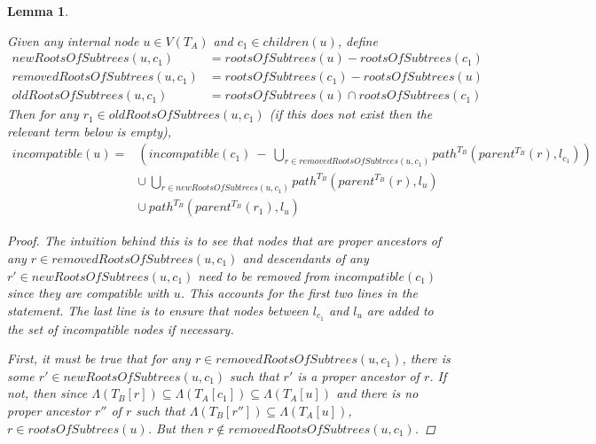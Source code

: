 \documentclass{article}
\newcommand{\leafset}{\Lambda}
\newtheorem{incompatibilityrecursive}[incompatibility]{Lemma}
\begin{document}
    \begin{incompatibilityrecursive}
        \label{lem:incompatibilityrecursive}

        Given any internal node $u \in V(T_A)$ and $c_1 \in children(u)$, define
        \begin{align*}
            newRootsOfSubtrees(u, c_1) &= rootsOfSubtrees(u) - rootsOfSubtrees(c_1)\\[0.5em]
            removedRootsOfSubtrees(u, c_1) &= rootsOfSubtrees(c_1) - rootsOfSubtrees(u)\\[0.5em]
            oldRootsOfSubtrees(u, c_1) &= rootsOfSubtrees(u) \cap rootsOfSubtrees(c_1)
        \end{align*}
        Then for any $r_1 \in oldRootsOfSubtrees(u, c_1)$ (if this does not exist then the relevant term below is empty),
        \begin{align*}
            incompatible(u) = &\left(incompatible(c_1)\ -\ \bigcup_{r \in removedRootsOfSubtrees(u, c_1)} path^{T_B}(parent^{T_B}(r), l_{c_1})\right)\\
            &\cup\ \bigcup_{r \in newRootsOfSubtrees(u, c_1)} path^{T_B}(parent^{T_B}(r), l_u)\\
            &\cup\ path^{T_B}(parent^{T_B}(r_1), l_u)
        \end{align*}

        \begin{proof}
            The intuition behind this is to see that nodes that are proper ancestors of any $r \in removedRootsOfSubtrees(u, c_1)$ and descendants of any $r' \in newRootsOfSubtrees(u, c_1)$ need to be removed from $incompatible(c_1)$ since they are compatible with $u$. This accounts for the first two lines in the statement. The last line is to ensure that nodes between $l_{c_1}$ and $l_u$ are added to the set of incompatible nodes if necessary.

            First, it must be true that for any $r \in removedRootsOfSubtrees(u, c_1)$, there is some $r' \in newRootsOfSubtrees(u, c_1)$ such that $r'$ is a proper ancestor of $r$. If not, then since $\leafset(T_B[r]) \subseteq \leafset(T_A[c_1]) \subseteq \leafset(T_A[u])$ and there is no proper ancestor $r''$ of $r$ such that $\leafset(T_B[r'']) \subseteq \leafset(T_A[u])$, $r \in rootsOfSubtrees(u)$. But then $r \not\in removedRootsOfSubtrees(u, c_1)$.


\end{proof}
\end{incompatibilityrecursive}
\end{document}
